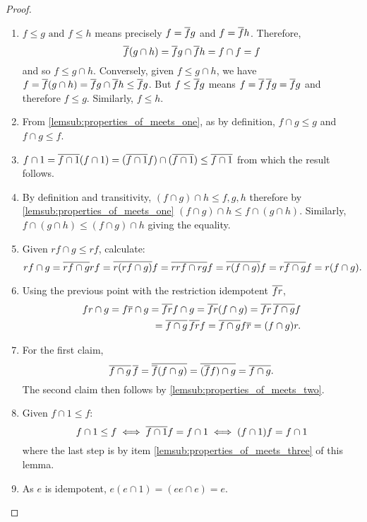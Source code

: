 \begin{proof}
  \prepprooflist
  \begin{enumerate}[{(}i{)}]
    \item $f\le g \text{ and } f \le h$ means precisely $f = \overline{f} g$ and $f = \overline{f} h$.
      Therefore,
      \[
        \overline{f} (g\cap h) =  \overline{f} g \cap \overline{f} h =  f\cap f = f
      \]
      and so $f \le g \cap h$. Conversely, given $f \le g\cap h$, we have
      $f = \overline{f} (g\cap h) = \overline{f} g \cap \overline{f} h \le \overline{f} g $. But
      $f \le \overline{f} g$ means $f = \overline{f}\,\overline{f} g = \overline{f}g$ and therefore
      $f \le g$. Similarly, $f \le h$.
    \item From \vref{lemsub:properties_of_meets_one}, as by definition, $f\cap g \le g$ and
      $f \cap g \le f$.
    \item $f\cap 1 = \overline{f\cap 1} (f \cap 1)= (\overline{f \cap 1} f ) \cap (\overline{f \cap 1})
      \le \overline{f \cap 1}$ from which the result follows. %
    \item By definition and transitivity, $(f\cap g)\cap h \le f, g, h$ therefore by
      \vref{lemsub:properties_of_meets_one} $(f \cap g) \cap h \le f \cap (g \cap h)$. Similarly,
      $f \cap (g \cap h) \le(f \cap g) \cap h$ giving the equality.
    \item Given  $r f \cap g \le r f$, calculate:
      \[
        r f\cap g
        = \overline{r f\cap g} r f
        = \overline{r (r f\cap g)} f
        = \overline{r r f\cap r g} f
        = \overline{r (f\cap g)} f
        = r \overline{f\cap g} f
        = r (f\cap g).
      \]
    \item Using the previous point with the restriction idempotent $\overline{f r}$,
      \begin{equation*}
        \begin{split}
          f r \cap g
          = f \restr{r} \cap g   %
          = \restr{f r }f \cap g  %
          = \restr{f r}(f\cap g)   %
          = \restr{f r}\, \restr{f\cap g} f \\ %
          = \restr{f\cap g}\, \restr{f r} f %
          = \restr{f\cap g} f \restr{r}  %
          = (f\cap g) r. %
        \end{split}
      \end{equation*}
    \item For the first claim,
      \[
        \overline{f\cap g}\, \overline{f} =\overline{\overline{f}(f\cap g)}\\
        =\overline{(\overline{f}f)\cap g} =\overline{f\cap g}.
      \]
      The second claim then follows by \vref{lemsub:properties_of_meets_two}.
    \item Given $ f \cap 1 \leq f$:
      \[
        f \cap 1 \leq f \iff  \overline{f \cap 1} f = f \cap 1 \iff  (f \cap 1) f = f \cap 1
      \]
      where the last step is by item \vref{lemsub:properties_of_meets_three} of this lemma.
    \item As $e$ is idempotent, $e (e\cap 1) = (e e \cap e) = e$.
  \end{enumerate}
\end{proof}

